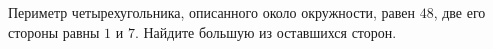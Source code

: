 \begin{ex}
	\begin{condition}
		Периметр четырехугольника, описанного около окружности, равен \( 48 \), две его стороны равны \( 1  \) и \( 7 \). Найдите большую из оставшихся сторон.
	\end{condition}
\end{ex}